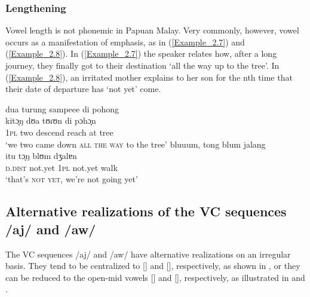 \subsubsection[Lengthening]{Lengthening\label{Para_2.3.2.3}}
Vowel length is not phonemic in Papuan Malay. Very commonly, however, vowel  occurs as a manifestation of emphasis, as in (\ref{Example_2.7}) and (\ref{Example_2.8}). In (\ref{Example_2.7}) the speaker relates how, after a long journey, they finally got to their destination  ‘all the way up to the tree’. In (\ref{Example_2.8}), an irritated mother explains to her son for the nth time that their date of departure has  ‘not yet’ come.



\ea
\label{Example_2.7}
 {dua} {turung} {sampeee} {di} {pohong}\\ %
 kitɔ̞ŋ  dʊa  tʊɾʊn    di  pɔhɔ̞n\\
\textsc{1pl}  two  descend  reach  at  tree\\
\glt ‘we two came down \textsc{all} \textsc{the} \textsc{way} to the tree’ \textstyleExampleSource{[080917-008-NP.0024]}
\z
\ea
\label{Example_2.8}
 {bluuum}, {tong} {blum} {jalang}\\ %
 itu    tɔ̞ŋ  blʊm  dʒalɐn\\
\textsc{d.dist}  not.yet  \textsc{1pl}  not.yet  walk\\
\glt ‘that’s \textsc{not} \textsc{yet}, we’re not going yet’ \textstyleExampleSource{[080921-001-CvNP.0007]}\\
\z


\subsection{Alternative realizations of the VC sequences /aj/ and /aw/\label{Para_2.3.3}}

The VC sequences /aj/ and /aw/ have alternative realizations on an irregular basis. They tend to be centralized to [] and [], respectively, as shown in , or they can be reduced to the open-mid vowels [] and [], respectively, as illustrated in  and .

